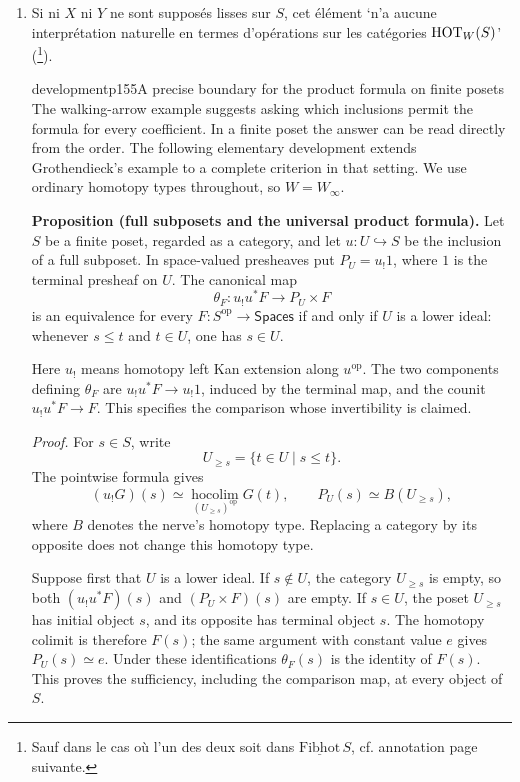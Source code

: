 \begin{enumerate}
\item[a)] Si ni $X$ ni $Y$ ne sont supposés lisses sur $S$, cet élément ‘n'a aucune interprétation naturelle en termes d'opérations sur les catégories $\mathrm{HOT}_W(S)$’ (\footnote[74]{Sauf dans le cas où l'un des deux soit dans $\underline{\mathrm{Fibhot}}\,S$, cf. annotation page suivante.}).


\begin{dcomment}{development}{p155}{A precise boundary for the product formula on finite posets}
The walking-arrow example suggests asking which inclusions permit the formula for every coefficient. In a finite poset the answer can be read directly from the order. The following elementary development extends Grothendieck's example to a complete criterion in that setting. We use ordinary homotopy types throughout, so $W=W_\infty$.

\textbf{Proposition (full subposets and the universal product formula).}\ours
Let $S$ be a finite poset, regarded as a category, and let $u:U\hookrightarrow S$ be the inclusion of a full subposet. In space-valued presheaves put $P_U=u_!1$, where $1$ is the terminal presheaf on $U$. The canonical map
\[
 \theta_F:u_!u^*F\longrightarrow P_U\times F
\]
is an equivalence for every $F:S^{\mathrm{op}}\longrightarrow\mathsf{Spaces}$ if and only if $U$ is a lower ideal: whenever $s\le t$ and $t\in U$, one has $s\in U$.

Here $u_!$ means homotopy left Kan extension along $u^{\mathrm{op}}$. The two components defining $\theta_F$ are $u_!u^*F\longrightarrow u_!1$, induced by the terminal map, and the counit $u_!u^*F\longrightarrow F$. This specifies the comparison whose invertibility is claimed.

\emph{Proof.} For $s\in S$, write
\[
 U_{\ge s}=\{t\in U\mid s\le t\}.
\]
The pointwise formula gives
\[
 (u_!G)(s)\simeq
 \operatorname*{hocolim}_{(U_{\ge s})^{\mathrm{op}}}G(t),
 \qquad
 P_U(s)\simeq B(U_{\ge s}),
\]
where $B$ denotes the nerve's homotopy type. Replacing a category by its opposite does not change this homotopy type.

Suppose first that $U$ is a lower ideal. If $s\notin U$, the category $U_{\ge s}$ is empty, so both $(u_!u^*F)(s)$ and $(P_U\times F)(s)$ are empty. If $s\in U$, the poset $U_{\ge s}$ has initial object $s$, and its opposite has terminal object $s$. The homotopy colimit is therefore $F(s)$; the same argument with constant value $e$ gives $P_U(s)\simeq e$. Under these identifications $\theta_F(s)$ is the identity of $F(s)$. This proves the sufficiency, including the comparison map, at every object of $S$.


\end{dcomment}
\end{enumerate}
